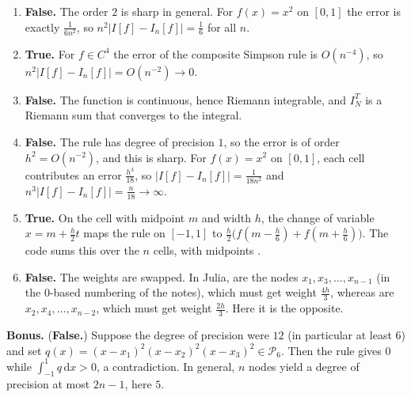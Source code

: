 \documentclass[a4paper]{article}
\renewcommand{\d}{\mathrm d}
\begin{document}
\begin{enumerate}[itemsep=8pt]
    \item \textbf{False.}
        The order $2$ is sharp in general.
        For $f(x) = x^2$ on $[0, 1]$ the error is exactly $\frac{1}{6 n^2}$, so $n^2 \lvert I[f] - I_n[f] \rvert = \frac{1}{6}$ for all $n$.

    \item \textbf{True.}
        For $f \in C^4$ the error of the composite Simpson rule is $O(n^{-4})$, so $n^2 \lvert I[f] - I_n[f] \rvert = O(n^{-2}) \to 0$.

    \item \textbf{False.}
        The function is continuous, hence Riemann integrable, and $I^T_N$ is a Riemann sum that converges to the integral.

    \item \textbf{False.}
        The rule has degree of precision $1$, so the error is of order $h^2 = O(n^{-2})$, and this is sharp.
        For $f(x) = x^2$ on $[0, 1]$, each cell contributes an error $\frac{h^3}{18}$, so $\lvert I[f] - I_n[f] \rvert = \frac{1}{18 n^2}$
        and $n^3 \lvert I[f] - I_n[f] \rvert = \frac{n}{18} \to \infty$.

    \item \textbf{True.}
        On the cell with midpoint $m$ and width $h$, the change of variable $x = m + \frac{h}{2} t$ maps the rule on $[-1, 1]$ to
        $\frac{h}{2} \bigl( f(m - \frac{h}{6}) + f(m + \frac{h}{6}) \bigr)$.
        The code sums this over the $n$ cells, with midpoints .

    \item \textbf{False.}
        The weights are swapped.
        In Julia,  are the nodes $x_1, x_3, \dotsc, x_{n-1}$ (in the 0-based numbering of the notes), which must get weight $\frac{4h}{3}$,
        whereas  are $x_2, x_4, \dotsc, x_{n-2}$, which must get weight $\frac{2h}{3}$.
        Here it is the opposite.
\end{enumerate}

\noindent\textbf{Bonus.} (\textbf{False.})
Suppose the degree of precision were $12$ (in particular at least $6$) and set $q(x) = (x - x_1)^2 (x - x_2)^2 (x - x_3)^2 \in \mathcal P_6$.
Then the rule gives $0$ while $\int_{-1}^1 q \, \d x > 0$, a contradiction.
In general, $n$ nodes yield a degree of precision at most $2n - 1$, here $5$.
\fi
\end{document}
